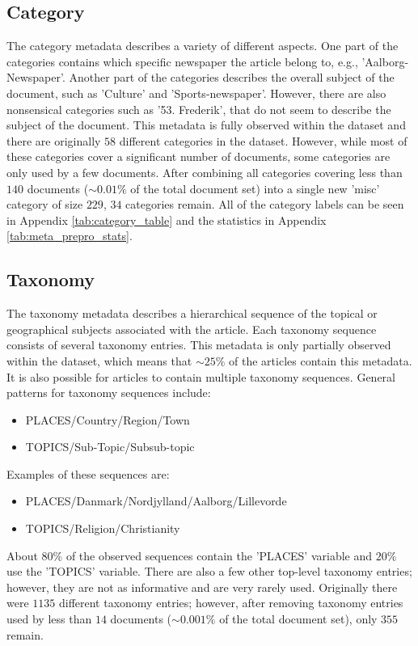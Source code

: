 \subsection{Category}
The category metadata describes a variety of different aspects.
One part of the categories contains which specific newspaper the article belong to, e.g., 'Aalborg-Newspaper'.
Another part of the categories describes the overall subject of the document, such as 'Culture' and 'Sports-newspaper'.
However, there are also nonsensical categories such as '53. Frederik', that do not seem to describe the subject of the document.
This metadata is fully observed within the dataset and there are originally $58$ different categories in the dataset.
However, while most of these categories cover a significant number of documents, some categories are only used by a few documents.
After combining all categories covering less than $140$ documents (${\sim}0.01\%$ of the total document set) into a single new 'misc' category of size $229$, $34$ categories remain.
All of the category labels can be seen in Appendix \autoref{tab:category_table} and the statistics in Appendix \autoref{tab:meta_prepro_stats}.

\subsection{Taxonomy}\label{sec:dataset_taxonomy}
The taxonomy metadata describes a hierarchical sequence of the topical or geographical subjects associated with the article.
Each taxonomy sequence consists of several taxonomy entries.
This metadata is only partially observed within the dataset, which means that ${\sim}25\%$ of the articles contain this metadata.
It is also possible for articles to contain multiple taxonomy sequences.
General patterns for taxonomy sequences include:
\begin{itemize}
	\item PLACES/Country/Region/Town
	\item TOPICS/Sub-Topic/Subsub-topic
\end{itemize}
Examples of these sequences are:
\begin{itemize}
	\item PLACES/Danmark/Nordjylland/Aalborg/Lillevorde
	\item TOPICS/Religion/Christianity
\end{itemize}
About $80\%$ of the observed sequences contain the 'PLACES' variable and $20\%$ use the 'TOPICS' variable.
There are also a few other top-level taxonomy entries; however, they are not as informative and are very rarely used.
Originally there were $1135$ different taxonomy entries; however, after removing taxonomy entries used by less than $14$ documents (${\sim}0.001\%$ of the total document set), only $355$ remain.
